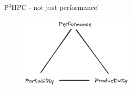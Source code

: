 \documentclass[10pt,aspectratio=169]{beamer}
\begin{document}
\begin{frame}{P$^3$HPC - not just performance!}

    
    \begin{figure}[H]
        \includegraphics[width=0.5\textwidth]{images/excalidraw_p3_triangle.png}
        \vspace*{0.75cm}
        \label{fig:warwick_mantevo_link}
    \end{figure}
\end{frame}
\end{document}
